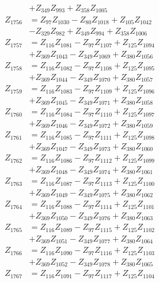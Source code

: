 \begin{multicols}{2}
\begin{align}
&+ Z_{349}Z_{993} + Z_{358}Z_{1005} \nonumber \\
Z_{1756} &= Z_{97}Z_{1030} - Z_{80}Z_{1018} + Z_{105}Z_{1042}  \nonumber \\
&- Z_{329}Z_{982} + Z_{349}Z_{994} + Z_{358}Z_{1006} \nonumber \\
Z_{1757} &= Z_{116}Z_{1081} - Z_{97}Z_{1107} + Z_{125}Z_{1094}  \nonumber \\
&+ Z_{369}Z_{1043} - Z_{349}Z_{1069} + Z_{380}Z_{1056} \nonumber \\
Z_{1758} &= Z_{116}Z_{1082} - Z_{97}Z_{1108} + Z_{125}Z_{1095}  \nonumber \\
&+ Z_{369}Z_{1044} - Z_{349}Z_{1070} + Z_{380}Z_{1057} \nonumber \\
Z_{1759} &= Z_{116}Z_{1083} - Z_{97}Z_{1109} + Z_{125}Z_{1096}  \nonumber \\
&+ Z_{369}Z_{1045} - Z_{349}Z_{1071} + Z_{380}Z_{1058} \nonumber \\
Z_{1760} &= Z_{116}Z_{1084} - Z_{97}Z_{1110} + Z_{125}Z_{1097}  \nonumber \\
&+ Z_{369}Z_{1046} - Z_{349}Z_{1072} + Z_{380}Z_{1059} \nonumber \\
Z_{1761} &= Z_{116}Z_{1085} - Z_{97}Z_{1111} + Z_{125}Z_{1098}  \nonumber \\
&+ Z_{369}Z_{1047} - Z_{349}Z_{1073} + Z_{380}Z_{1060} \nonumber \\
Z_{1762} &= Z_{116}Z_{1086} - Z_{97}Z_{1112} + Z_{125}Z_{1099}  \nonumber \\
&+ Z_{369}Z_{1048} - Z_{349}Z_{1074} + Z_{380}Z_{1061} \nonumber \\
Z_{1763} &= Z_{116}Z_{1087} - Z_{97}Z_{1113} + Z_{125}Z_{1100}  \nonumber \\
&+ Z_{369}Z_{1049} - Z_{349}Z_{1075} + Z_{380}Z_{1062} \nonumber \\
Z_{1764} &= Z_{116}Z_{1088} - Z_{97}Z_{1114} + Z_{125}Z_{1101}  \nonumber \\
&+ Z_{369}Z_{1050} - Z_{349}Z_{1076} + Z_{380}Z_{1063} \nonumber \\
Z_{1765} &= Z_{116}Z_{1089} - Z_{97}Z_{1115} + Z_{125}Z_{1102}  \nonumber \\
&+ Z_{369}Z_{1051} - Z_{349}Z_{1077} + Z_{380}Z_{1064} \nonumber \\
Z_{1766} &= Z_{116}Z_{1090} - Z_{97}Z_{1116} + Z_{125}Z_{1103}  \nonumber \\
&+ Z_{369}Z_{1052} - Z_{349}Z_{1078} + Z_{380}Z_{1065} \nonumber \\
Z_{1767} &= Z_{116}Z_{1091} - Z_{97}Z_{1117} + Z_{125}Z_{1104}  \nonumber \\

\end{align}
\end{multicols}
